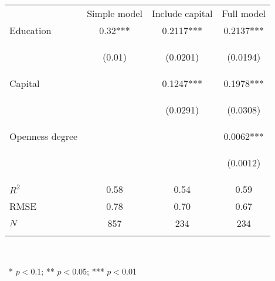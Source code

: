 \begin{center}
\begin{tabular}{lccc}
\hline \noalign{\smallskip} & Simple model & Include capital & Full model\\
\noalign{\smallskip}\hline \noalign{\smallskip}Education & 0.32*** & 0.2117*** & 0.2137***\\
 & \begin{footnotesize}(0.01)\end{footnotesize} & \begin{footnotesize}(0.0201)\end{footnotesize} & \begin{footnotesize}(0.0194)\end{footnotesize}\\
\noalign{\smallskip}Capital &  & 0.1247*** & 0.1978***\\
 & \begin{footnotesize}\end{footnotesize} & \begin{footnotesize}(0.0291)\end{footnotesize} & \begin{footnotesize}(0.0308)\end{footnotesize}\\
\noalign{\smallskip}Openness degree &  &  & 0.0062***\\
 & \begin{footnotesize}\end{footnotesize} & \begin{footnotesize}\end{footnotesize} & \begin{footnotesize}(0.0012)\end{footnotesize}\\
\noalign{\smallskip}$R^2$ & 0.58 & 0.54 & 0.59\\
RMSE & 0.78 & 0.70 & 0.67\\
$N$ & 857 & 234 & 234\\
\noalign{\smallskip}\hline\end{tabular}\\
\smallskip\begin{footnotesize}\ * $p<0$.1; ** $p<0$.05; *** $p<0$.01\end{footnotesize}\\
\smallskip
\end{center}
